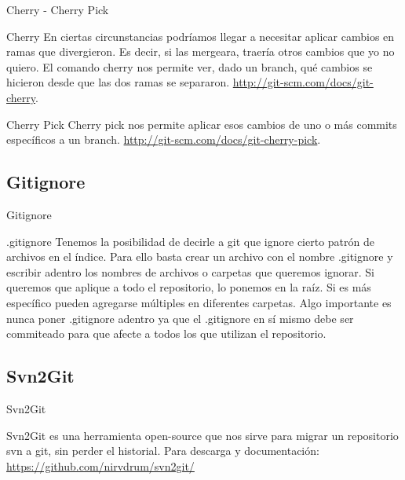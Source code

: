 \documentclass{beamer}
\begin{document}
\begin{frame}{Cherry - Cherry Pick}
  \begin{block}{Cherry}
  En ciertas circunstancias podríamos llegar a necesitar aplicar cambios en ramas que divergieron. Es decir, si 
  las mergeara, traería otros cambios que yo no quiero. El comando cherry nos permite ver, dado un branch, qué cambios
  se hicieron desde que las dos ramas se separaron. \url{http://git-scm.com/docs/git-cherry}.
  \end{block}
  \pause
  \begin{block}{Cherry Pick}
  Cherry pick nos permite aplicar esos cambios de uno o más commits específicos a un branch. \url{http://git-scm.com/docs/git-cherry-pick}.
  \end{block}
\end{frame}

\subsection{Gitignore}

\begin{frame}{Gitignore}
  \begin{block}{.gitignore}
      Tenemos la posibilidad de decirle a git que ignore cierto patrón de archivos en el índice. Para ello basta crear un archivo con el nombre .gitignore
      y escribir adentro los nombres de archivos o carpetas que queremos ignorar. Si queremos que aplique a todo el repositorio, lo ponemos en la raíz.
      Si es más específico pueden agregarse múltiples en diferentes carpetas. Algo importante es nunca poner .gitignore adentro ya que el .gitignore en
      sí mismo debe ser commiteado para que afecte a todos los que utilizan el repositorio.
  \end{block}

\end{frame}

\subsection{Svn2Git}

\begin{frame}{Svn2Git}
  \begin{block}{}
      Svn2Git es una herramienta open-source que nos sirve para migrar un repositorio svn a git, sin perder el historial.
      Para descarga y documentación: \url{https://github.com/nirvdrum/svn2git/}
  \end{block}

\end{frame}
\end{document}
